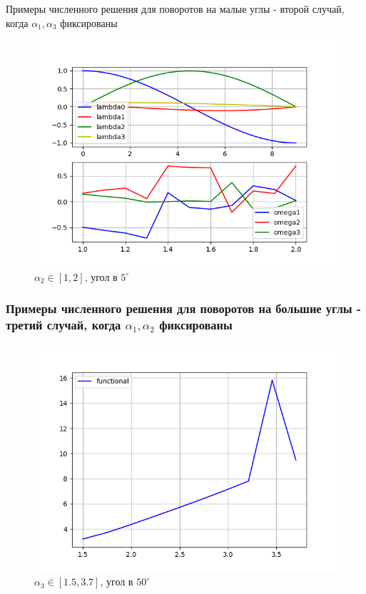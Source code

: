 \documentclass[10pt,utf8,presentation,notheorems,xcolor=dvipsnames,compress]{beamer}
\begin{document}
\begin{frame}{Примеры численного решения для поворотов на малые углы - второй случай, когда $\alpha_1, \alpha_3$ фиксированы}
\begin{figure}[H]
\center\includegraphics[scale=0.5]{fig/ivp_and_control_alpha2_1-2_5.png}
\caption{$\alpha_2 \in [1, 2]$, угол в $5^{\circ}$}
\end{figure}
\end{frame}

\begin{frame}
\frametitle{Примеры численного решения для поворотов на большие углы - третий случай, когда $\alpha_1, \alpha_2$ фиксированы}
\begin{figure}[H]
\center\includegraphics[scale=0.5]{fig/functional_1_5-3_7_50.png}
\caption{$\alpha_3 \in [1.5, 3.7]$, угол в $50^{\circ}$}
\end{figure}
\end{frame}
\end{document}

